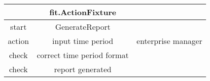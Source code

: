 \documentclass{report}
\begin{document}
\begin{tabular}{|c|c|c|}
\hline \multicolumn{1}{c}{} & \multicolumn{1}{c}{fit.ActionFixture} & \multicolumn{1}{c}{} \\ \hline
\hline start & GenerateReport &  \\ 
\hline action & input time period & enterprise manager \\ 
\hline check & correct time period format &  \\ 
\hline check & report generated &  \\ 
\hline 
\end{tabular} 
\end{document}
